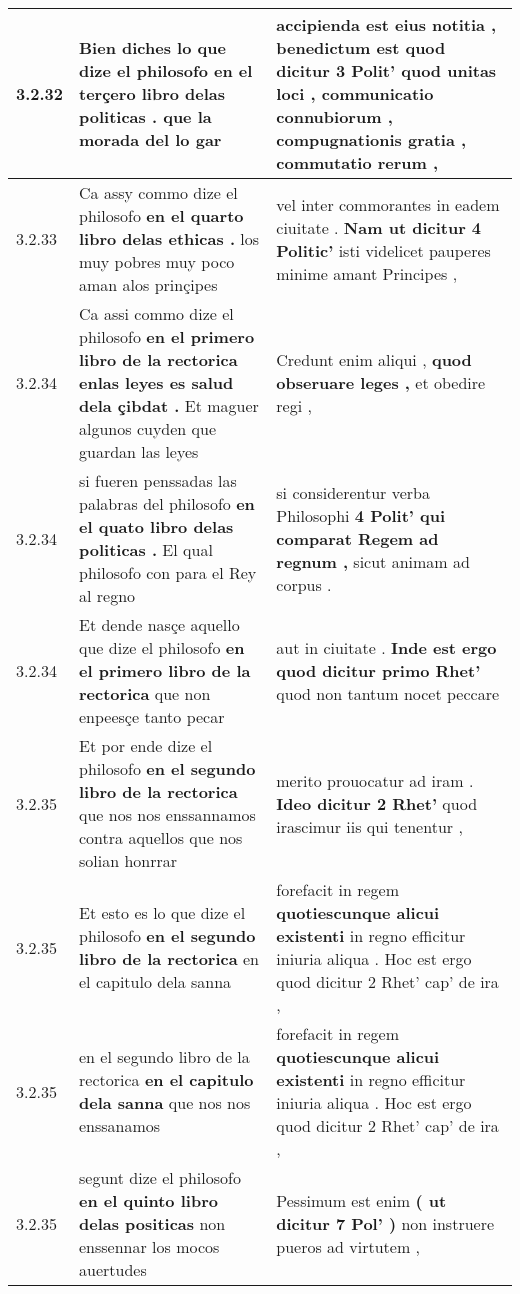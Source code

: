 \begin{tabular}{|p{1cm}|p{6.5cm}|p{6.5cm}|}
3.2.32 & Bien diches lo que dize el philosofo \textbf{ en el terçero libro delas politicas . } que la morada del lo gar & accipienda est eius notitia , \textbf{ benedictum est quod dicitur 3 Polit’ } quod unitas loci , communicatio connubiorum , compugnationis gratia , commutatio rerum , \\\hline
3.2.33 & Ca assy commo dize el philosofo \textbf{ en el quarto libro delas ethicas . } los muy pobres muy poco aman alos prinçipes & vel inter commorantes in eadem ciuitate . \textbf{ Nam ut dicitur 4 Politic’ } isti videlicet pauperes minime amant Principes , \\\hline
3.2.34 & Ca assi commo dize el philosofo \textbf{ en el primero libro de la rectorica enlas leyes es salud dela çibdat . } Et maguer algunos cuyden que guardan las leyes & Credunt enim aliqui , \textbf{ quod obseruare leges , } et obedire regi , \\\hline
3.2.34 & si fueren penssadas las palabras del philosofo \textbf{ en el quato libro delas politicas . } El qual philosofo con para el Rey al regno & si considerentur verba Philosophi \textbf{ 4 Polit’ qui comparat Regem ad regnum , } sicut animam ad corpus . \\\hline
3.2.34 & Et dende nasçe aquello que dize el philosofo \textbf{ en el primero libro de la rectorica } que non enpeesçe tanto pecar & aut in ciuitate . \textbf{ Inde est ergo quod dicitur primo Rhet’ } quod non tantum nocet peccare \\\hline
3.2.35 & Et por ende dize el philosofo \textbf{ en el segundo libro de la rectorica } que nos nos enssannamos contra aquellos que nos solian honrrar & merito prouocatur ad iram . \textbf{ Ideo dicitur 2 Rhet’ } quod irascimur iis qui tenentur , \\\hline
3.2.35 & Et esto es lo que dize el philosofo \textbf{ en el segundo libro de la rectorica } en el capitulo dela sanna & forefacit in regem \textbf{ quotiescunque alicui existenti } in regno efficitur iniuria aliqua . Hoc est ergo quod dicitur 2 Rhet’ cap’ de ira , \\\hline
3.2.35 & en el segundo libro de la rectorica \textbf{ en el capitulo dela sanna } que nos nos enssanamos & forefacit in regem \textbf{ quotiescunque alicui existenti } in regno efficitur iniuria aliqua . Hoc est ergo quod dicitur 2 Rhet’ cap’ de ira , \\\hline
3.2.35 & segunt dize el philosofo \textbf{ en el quinto libro delas positicas } non enssennar los mocos auertudes & Pessimum est enim \textbf{ ( ut dicitur 7 Pol’ ) } non instruere pueros ad virtutem , \\\hline

\end{tabular}
